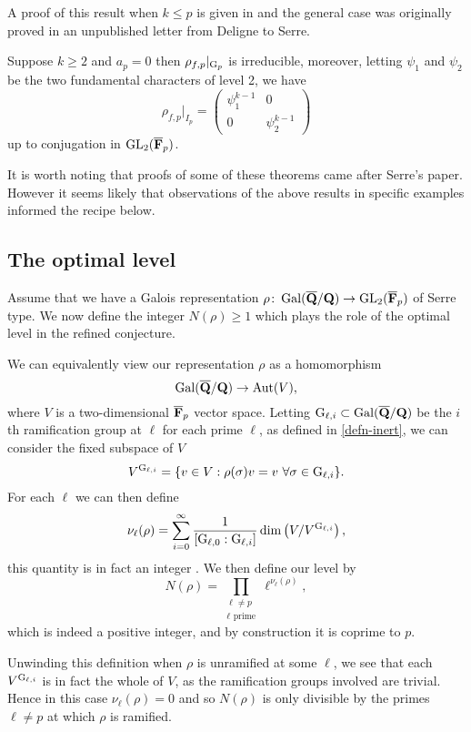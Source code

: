 \documentclass[a4paper,12pt]{article}
\begin{document}
A proof of this result when $k \le p$ is given in \cite{Gross} and the general case was originally proved in an unpublished letter from Deligne to Serre.

\begin{thm}[Fontaine]
Suppose $k\ge 2$ and $a_p = 0$ then $\rho_{f,p}|_{\mathrm{G}_p}$ is irreducible, moreover, letting $\psi_1$ and $\psi_2$ be the two fundamental characters of level 2, we have
\[
\rho_{f,p}|_{I_p} = \begin{pmatrix} \psi_1^{k-1} & 0 \\ 0 & \psi_2^{k-1}\end{pmatrix}
\]
up to conjugation in $\operatorname{GL}_2(\overline{\mathbf{F}}_p)$.
\end{thm}

It is worth noting that proofs of some of these theorems came after Serre's paper.
However it seems likely that observations of the above results in specific examples informed the recipe below.


\subsection{The optimal level}
Assume that we have a Galois representation $\rho\colon \operatorname{Gal}(\overline{\mathbf{Q}}/\mathbf{Q}) \to \operatorname{GL}_2(\overline{\mathbf{F}}_p)$ of Serre type.
We now define the integer $N(\rho) \ge 1$ which plays the role of the optimal level in the refined conjecture.

We can equivalently view our representation $\rho$ as a homomorphism
\[
\operatorname{Gal}(\overline{\mathbf{Q}}/\mathbf{Q}) \to \operatorname{Aut}(V),
\]
where $V$ is a two-dimensional $\overline{\mathbf{F}}_p$ vector space.
Letting $\mathrm{G}_{\ell,i}\subset \operatorname{Gal}(\overline{\mathbf{Q}}/\mathbf{Q})$ be the $i$th ramification group at $\ell$ for each prime $\ell$, as defined in \cref{defn-inert}, we can consider the fixed subspace of $V$
\[
V^{\mathrm{G}_{\ell,i}} = \{v\in V : \rho(\sigma) v = v\ \forall \sigma \in \mathrm{G}_{\ell,i}\}.
\]
For each $\ell$ we can then define
\[
\nu_\ell(\rho) = \sum_{i = 0}^{\infty} \frac{1}{[\mathrm{G}_{\ell,0} : \mathrm{G}_{\ell,i}]} \dim\left(V/V^{\mathrm{G}_{\ell,i}}\right),
\]
this quantity is in fact an integer \cite{}. %
We then define our level by
\[
N(\rho) = \prod_{\substack{\ell \ne p\\ \ell\text{ prime}}} \ell^{\nu_\ell(\rho)},
\]
which is indeed a positive integer, and by construction it is coprime to $p$.

\begin{rmk}\label{rmk-unram}
Unwinding this definition when $\rho$ is unramified at some $\ell$, we see that each $V^{\mathrm{G}_{\ell,i}}$ is in fact the whole of $V$, as the ramification groups involved are trivial. %
Hence in this case $\nu_\ell(\rho) = 0$ and so $N(\rho)$ is only divisible by the primes $\ell \ne p$ at which $\rho$ is ramified.
\end{rmk}
\end{document}
